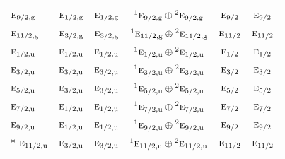 \documentclass[10pt,a4paper]{article}
\numberwithin{equation}{section}
\newcommand{\irr}[1]{\text{\normalfont\scshape #1}}
\newcommand{\conjpair}[1]{{}^{#1}}
\newcommand{\ptag}[1]{\mathrm{#1}}
\begin{document}
{\begin{longtable}{@{}lccccc@{}}
$\irr{e}_{9/2,\ptag{g}}$ & $\irr{e}_{1/2,\ptag{g}}$ & $\irr{e}_{1/2,\ptag{g}}$ & $\conjpair{1}\irr{e}_{9/2,\ptag{g}}\oplus \conjpair{2}\irr{e}_{9/2,\ptag{g}}$ & $\irr{e}_{9/2}$ & $\irr{e}_{9/2}$\\
$\irr{e}_{11/2,\ptag{g}}$ & $\irr{e}_{3/2,\ptag{g}}$ & $\irr{e}_{3/2,\ptag{g}}$ & $\conjpair{1}\irr{e}_{11/2,\ptag{g}}\oplus \conjpair{2}\irr{e}_{11/2,\ptag{g}}$ & $\irr{e}_{11/2}$ & $\irr{e}_{11/2}$\\
$\irr{e}_{1/2,\ptag{u}}$ & $\irr{e}_{1/2,\ptag{u}}$ & $\irr{e}_{1/2,\ptag{u}}$ & $\conjpair{1}\irr{e}_{1/2,\ptag{u}}\oplus \conjpair{2}\irr{e}_{1/2,\ptag{u}}$ & $\irr{e}_{1/2}$ & $\irr{e}_{1/2}$\\
$\irr{e}_{3/2,\ptag{u}}$ & $\irr{e}_{3/2,\ptag{u}}$ & $\irr{e}_{3/2,\ptag{u}}$ & $\conjpair{1}\irr{e}_{3/2,\ptag{u}}\oplus \conjpair{2}\irr{e}_{3/2,\ptag{u}}$ & $\irr{e}_{3/2}$ & $\irr{e}_{3/2}$\\
$\irr{e}_{5/2,\ptag{u}}$ & $\irr{e}_{3/2,\ptag{u}}$ & $\irr{e}_{3/2,\ptag{u}}$ & $\conjpair{1}\irr{e}_{5/2,\ptag{u}}\oplus \conjpair{2}\irr{e}_{5/2,\ptag{u}}$ & $\irr{e}_{5/2}$ & $\irr{e}_{5/2}$\\
$\irr{e}_{7/2,\ptag{u}}$ & $\irr{e}_{1/2,\ptag{u}}$ & $\irr{e}_{1/2,\ptag{u}}$ & $\conjpair{1}\irr{e}_{7/2,\ptag{u}}\oplus \conjpair{2}\irr{e}_{7/2,\ptag{u}}$ & $\irr{e}_{7/2}$ & $\irr{e}_{7/2}$\\
$\irr{e}_{9/2,\ptag{u}}$ & $\irr{e}_{1/2,\ptag{u}}$ & $\irr{e}_{1/2,\ptag{u}}$ & $\conjpair{1}\irr{e}_{9/2,\ptag{u}}\oplus \conjpair{2}\irr{e}_{9/2,\ptag{u}}$ & $\irr{e}_{9/2}$ & $\irr{e}_{9/2}$\\*
$\irr{e}_{11/2,\ptag{u}}$ & $\irr{e}_{3/2,\ptag{u}}$ & $\irr{e}_{3/2,\ptag{u}}$ & $\conjpair{1}\irr{e}_{11/2,\ptag{u}}\oplus \conjpair{2}\irr{e}_{11/2,\ptag{u}}$ & $\irr{e}_{11/2}$ & $\irr{e}_{11/2}$\\
\bottomrule\end{longtable}}
\end{document}
